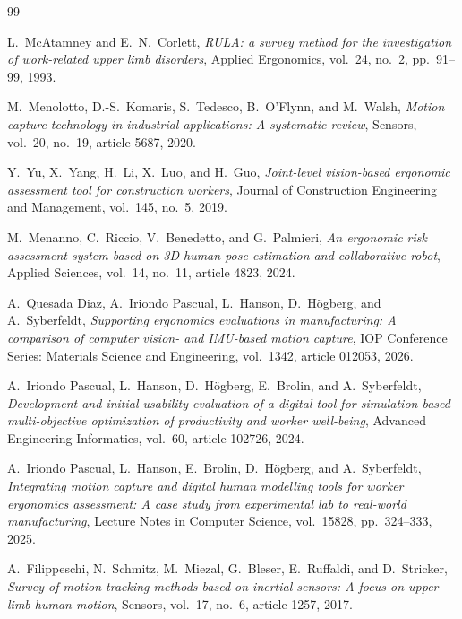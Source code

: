 \documentclass[12pt,a4paper]{article}
\begin{document}
\clearpage

\begin{thebibliography}{99}

L.~McAtamney and E.~N.~Corlett,
\textit{RULA: a survey method for the investigation of work-related upper limb disorders},
Applied Ergonomics, vol.~24, no.~2, pp.~91--99, 1993.

M.~Menolotto, D.-S.~Komaris, S.~Tedesco, B.~O'Flynn, and M.~Walsh,
\textit{Motion capture technology in industrial applications: A systematic review},
Sensors, vol.~20, no.~19, article 5687, 2020.

Y.~Yu, X.~Yang, H.~Li, X.~Luo, and H.~Guo,
\textit{Joint-level vision-based ergonomic assessment tool for construction workers},
Journal of Construction Engineering and Management, vol.~145, no.~5, 2019.

M.~Menanno, C.~Riccio, V.~Benedetto, and G.~Palmieri,
\textit{An ergonomic risk assessment system based on 3D human pose estimation and collaborative robot},
Applied Sciences, vol.~14, no.~11, article 4823, 2024.

A.~Quesada Diaz, A.~Iriondo Pascual, L.~Hanson, D.~H{\"o}gberg, and A.~Syberfeldt,
\textit{Supporting ergonomics evaluations in manufacturing: A comparison of computer vision- and IMU-based motion capture},
IOP Conference Series: Materials Science and Engineering, vol.~1342, article 012053, 2026.

A.~Iriondo Pascual, L.~Hanson, D.~H{\"o}gberg, E.~Brolin, and A.~Syberfeldt,
\textit{Development and initial usability evaluation of a digital tool for simulation-based multi-objective optimization of productivity and worker well-being},
Advanced Engineering Informatics, vol.~60, article 102726, 2024.

A.~Iriondo Pascual, L.~Hanson, E.~Brolin, D.~H{\"o}gberg, and A.~Syberfeldt,
\textit{Integrating motion capture and digital human modelling tools for worker ergonomics assessment: A case study from experimental lab to real-world manufacturing},
Lecture Notes in Computer Science, vol.~15828, pp.~324--333, 2025.

A.~Filippeschi, N.~Schmitz, M.~Miezal, G.~Bleser, E.~Ruffaldi, and D.~Stricker,
\textit{Survey of motion tracking methods based on inertial sensors: A focus on upper limb human motion},
Sensors, vol.~17, no.~6, article 1257, 2017.


\end{thebibliography}
\end{document}
